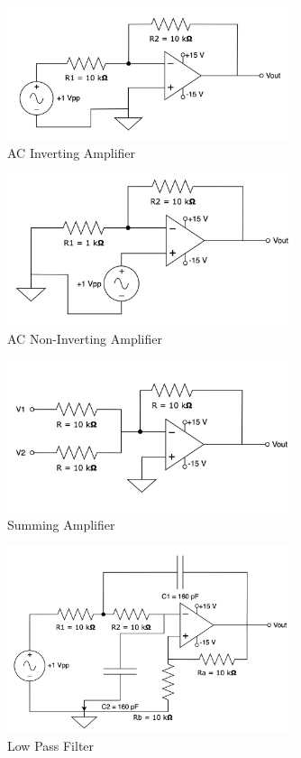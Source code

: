 \documentclass[CMPE]{KGCOEReport}
\begin{document}
\begin{figure}[H]
    \centering
    \includegraphics[width=0.75\textwidth]{3.png}
    \caption{AC Inverting Amplifier}
    \label{fig:part3}
\end{figure}

\begin{figure}[H]
    \centering
    \includegraphics[width=0.75\textwidth]{4.png}
    \caption{AC Non-Inverting Amplifier}
    \label{fig:part4}
\end{figure}

\begin{figure}[H]
    \centering
    \includegraphics[width=0.75\textwidth]{5.png}
    \caption{Summing Amplifier}
    \label{fig:part5}
\end{figure}

\begin{figure}[H]
    \centering
    \includegraphics[width=0.75\textwidth]{6.png}
    \caption{Low Pass Filter}
    \label{fig:part6}
\end{figure}
\end{document}
